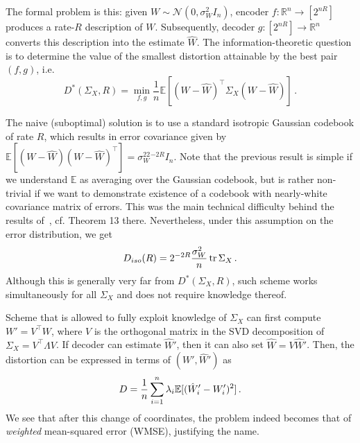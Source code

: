 \documentclass[journal]{IEEEtran}
\newcommand{\RR}{\mathbb{R}}
\newcommand{\trace}{\mathop{\mathrm{tr}}}
\def\tr{\trace}
\def\EE{\mathbb{E}}
\newcommand{\m}{\mathcal}
\begin{document}
The formal problem is this: given $W\sim\m{N}(0,\sigma_W^2 I_n)$,  encoder $f:\RR^n\to[2^{nR}]$ produces a
rate-$R$ description of $W$. Subsequently, decoder $g:[2^{nR}]\to\RR^n$ converts this
description into the estimate $\hat W$. The information-theoretic question is to determine the value of the smallest distortion attainable by the best pair $(f,g)$, i.e. 
$$ D^*(\Sigma_X, R) = \min_{f,g} \frac{1}{n} \EE[ (W-\hat W)^\top \Sigma_X (W-\hat W)]\,.$$

The naive (suboptimal) solution is to use a standard isotropic Gaussian codebook of rate $R$,
which results in error covariance given by $\EE[(W-\hat W)(W-\hat W)^{\top}] = \sigma_W^22^{-2R} I_n$.
Note that the previous result is simple if we understand $\EE$ as averaging over the Gaussian
codebook, but is rather non-trivial if we want to demonstrate existence of a codebook with
nearly-white covariance matrix of errors. This was the main technical difficulty behind the
results of~\cite{ordentlich2024optimal}, cf. Theorem 13 there. Nevertheless, under this assumption
on the error distribution, we get
\begin{equation}\label{eq:Diso}
	D_{iso}(R) = 2^{-2R} {\sigma_W^2\over n} \tr \Sigma_X\,.
\end{equation}
Although this is generally very far from $D^*(\Sigma_X,R)$, such scheme works simultaneously for
all $\Sigma_X$ and does not require knowledge thereof.

Scheme that is allowed to fully exploit knowledge of $\Sigma_X$ can first compute $W' = V^\top W$,
where $V$ is the orthogonal matrix in the SVD decomposition of  $\Sigma_X = V^\top \Lambda V$.
If decoder can estimate $\hat W'$, then it can also set $\hat W = V \hat W'$. Then, the distortion
can be expressed in terms of $(W', \hat W')$ as 
$$ D = {1\over n} \sum_{i=1}^n \lambda_i \EE[(\hat W_i'-W_i')^2]\,.$$
We see that after this change of coordinates, the problem indeed becomes that of \emph{weighted}
mean-squared error (WMSE), justifying the name.
\end{document}

